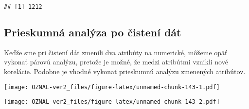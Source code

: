\documentclass[
]{article}
\newenvironment{Shaded}{\begin{snugshade}}{\end{snugshade}}
\newcommand{\AttributeTok}[1]{\textcolor[rgb]{0.77,0.63,0.00}{#1}}
\newcommand{\FunctionTok}[1]{\textcolor[rgb]{0.00,0.00,0.00}{#1}}
\newcommand{\NormalTok}[1]{#1}
\newcommand{\SpecialCharTok}[1]{\textcolor[rgb]{0.00,0.00,0.00}{#1}}
\newcommand{\StringTok}[1]{\textcolor[rgb]{0.31,0.60,0.02}{#1}}
\begin{document}
\begin{verbatim}
## [1] 1212
\end{verbatim}

\hypertarget{prieskumnuxe1-analuxfdza-po-ux10distenuxed-duxe1t}{%
\subsection{Prieskumná analýza po čistení
dát}\label{prieskumnuxe1-analuxfdza-po-ux10distenuxed-duxe1t}}

Keďže sme pri čistení dát zmenili dva atribúty na numerické, môžeme opäť
vykonať párovú analýzu, pretože je možné, že medzi atribútmi vznikli
nové korelácie. Podobne je vhodné vykonať prieskumnú analýzu zmenených
atribútov.

\begin{Shaded}
\end{Shaded}

\texttt{[image: OZNAL-ver2\_files/figure-latex/unnamed-chunk-143-1.pdf]}

\begin{Shaded}
\end{Shaded}

\texttt{[image: OZNAL-ver2\_files/figure-latex/unnamed-chunk-143-2.pdf]}

\begin{Shaded}
\end{Shaded}
\end{document}
